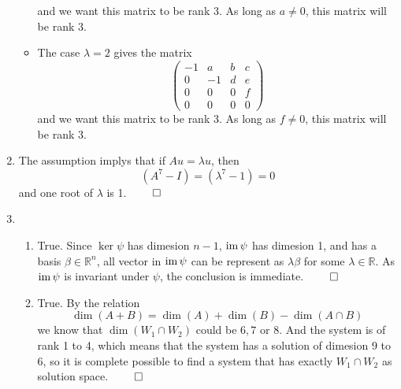 \begin{enumerate}
\begin{itemize}
\[        \]
        and we want this matrix to be rank 3. As long as $a \neq 0$, this matrix will be rank 3.
        \item The case $\lambda = 2$ gives the matrix
        \[
        \begin{pmatrix}
            -1 & a & b & c \\
            0 & -1 & d & e \\
            0 & 0 & 0 & f \\
            0 & 0 & 0 & 0
        \end{pmatrix}
        \]
        and we want this matrix to be rank 3.  As long as $f \neq 0$, this matrix will be rank 3.	
    \end{itemize}
    \item The assumption implys that if $Au = \lambda u$, then 
    \[
    (A^7 - I) = (\lambda^7 - 1) = 0
    \]
    and one root of $\lambda$ is 1. $\qed$
    \item 
    \begin{enumerate}
        \item True. Since $\ker \psi$ has dimesion $n-1$, $\operatorname{im} \psi$ has dimesion 1, and has a basis $\beta \in \mathbb{R}^n$, all vector in $\operatorname{im} \psi$ can be represent as $\lambda \beta$ for some $\lambda \in \mathbb{R}$. As $\operatorname{im} \psi$ is invariant under $\psi$, the conclusion is immediate. $\qed$
        \item True. By the relation
        \[
        \dim (A+B) = \dim(A) + \dim(B) - \dim(A\cap B)	
        \]
        we know that $\dim(W_1\cap W_2)$ could be $6,7$ or 8. And the system is of rank 1 to 4, which means that the system has a solution of dimesion 9 to 6, so it is complete possible to find a system that has exactly $W_1 \cap W_2$ as solution space. $\qed$ 
    \end{enumerate}
\end{enumerate}
